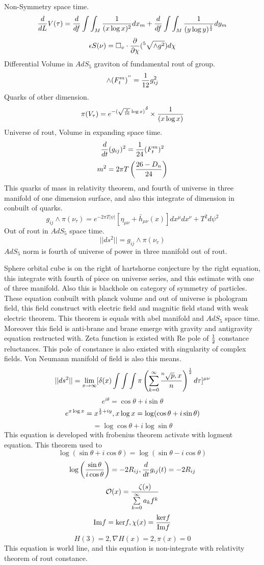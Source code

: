 \documentclass{jsarticle}
\begin{document}
{ Non-Symmetry space time.
 $$ {d \over dL}V(\tau) = {d \over df}\int \int_M {1 \over (x \log x)^2}dx_m + {d \over df}\int \int_M
 {1 \over (y \log y)^{1 \over 2}}dy_m $$
 $$ \epsilon S(\nu) = \square_v \cdot {\partial \over \partial \chi}({}^5 \sqrt{\wedge g^2})d\chi $$
 Differential Volume in $AdS_5$ graviton of fundamental rout of group.
 $$ \wedge (F^m_t)^{''} = {1 \over 12}g_{ij}^2$$
 Quarks of other dimension.
 $$ \pi(V_{\tau}) = {e^{-(\sqrt{\pi \over 16}\log x)}}^{\delta} \times {1 \over (x \log x)} $$
 Universe of rout, Volume in expanding space time.
 $$ {d \over dt}(g_{ij})^2 = {1 \over 24}(F^m_t)^2 $$
 $$ m^2 = 2 \pi T \left({26 - D_n \over 24}\right) $$
 This quarks of mass in relativity theorem, and fourth of universe in three manifold of one dimension surface,
 and also this integrate of dimension in conbuilt of quarks.
 $$ g_{ij} \wedge \pi(\nu_{\tau}) = e^{-2 \pi T |\psi|}[\eta_{\mu\nu} + \bar{h}_{\mu\nu}(x)]dx^{\mu}dx^{\nu} 
 + T^2 d \psi^2 $$
 Out of rout in $AdS_5$ space time.
 $$ ||ds^2|| = g_{ij}\wedge \pi(\nu_v) $$
 $AdS_5$ norm is fourth of universe of power in three manifold out of rout.


  Sphere orbital cube is on the right of hartshorne conjecture by the right equation,
this integrate with fourth of piece on universe series, and this estimate with one of three manifold.
Also this is blackhole on category of symmetry of particles.
These equation conbuilt with planck volume and out of universe is phologram field, this field construct with
electric field and magnitic field stand with weak electric theorem.
This theorem is equals with abel manifold and $AdS_5$ space time.
Moreover this field is anti-brane and brane emerge with gravity and antigravity equation restructed with.
Zeta function is existed with Re pole of ${1 \over 2}$ constance reluctances.
This pole of constance is also existed with singularity of complex fields.
Von Neumann manifold of field is also this means.
$$ ||ds^2|| = \lim_{x \to \infty} [\delta(x)\int \int \int \pi \left( \sum_{k=0}^{\infty}{{}^n\sqrt{p},x \over n}\right)
^{1 \over 2}d \tau]^{\mu\nu} $$
$$ e^{i \theta} = \cos \theta + i \sin \theta $$
$$ e^{x \log x} = x^{{1 \over 2} + iy}, x \log x = \log (\cos \theta + i \sin \theta) $$
$$ = \log \cos \theta + i \log \sin \theta $$
This equation is developed with frobenius theorem activate with logment equation.
This theorem used to
$$ \log(\sin \theta + i \cos \theta)= \log(\sin \theta - i \cos \theta) $$
$$ \log \left({\sin \theta \over i \cos \theta}\right) = -2 R_{ij}, {d \over dt}g_{ij}(t) =  - 2 R_{ij} $$
$$ \mathcal{O}(x) = {\zeta(s) \over \sum\limits_{k=0}^{\infty}a_k f^k} $$
$$ \mathrm{Im} f = \mathrm{ker} f, \chi(x) = {\mathrm{ker}f \over \mathrm{Im}f} $$ $$ H(3) = 2, \nabla H(x) = 2, 
 \pi(x) = 0 $$
 This equation is world line, and this equation is non-integrate with relativity theorem of rout constance.

}
\end{document}
